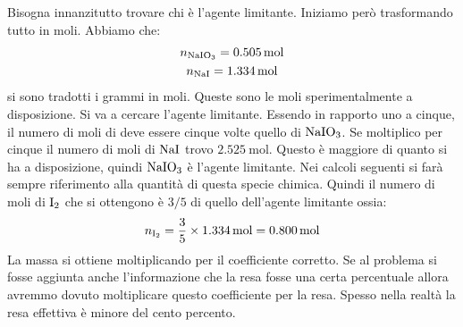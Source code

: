 \documentclass[../AppuntiChimica]{subfiles}
\begin{document}
	\begin{svol}
		Bisogna innanzitutto trovare chi è l'agente limitante. Iniziamo però trasformando tutto in moli. Abbiamo che:
		\begin{gather*}
			n_{\text{NaIO}_{3}}=\SI{0.505}{\mole}\\
			n_{\text{NaI}}=\SI{1.334}{\mole}
		\end{gather*}
		si sono tradotti i grammi in moli. Queste sono le moli sperimentalmente a disposizione. Si va a cercare l'agente limitante. Essendo in rapporto uno a cinque, il numero di moli di  deve essere cinque volte quello di $ \text{NaIO}_{3} $. Se moltiplico per cinque il numero di moli di $ \text{NaI} $ trovo $ \SI{2.525}{\mole} $. Questo è maggiore di quanto si ha a disposizione, quindi $ \text{NaIO}_{3} $ è l'agente limitante. Nei calcoli seguenti si farà sempre riferimento alla quantità di questa specie chimica. Quindi il numero di moli di $ \text{I}_{2} $ che si ottengono è $ 3/5 $ di quello dell'agente limitante ossia:
		\begin{gather*}
		n_{\text{I}_{2}}=\dfrac{3}{5}\times\SI{1.334}{\mole}=\SI{0.800}{\mole}
		\end{gather*}
		La massa si ottiene moltiplicando per il coefficiente corretto. Se al problema si fosse aggiunta anche l'informazione che la resa fosse una certa percentuale allora avremmo dovuto moltiplicare questo coefficiente per la resa. Spesso nella realtà la resa effettiva è minore del cento percento.
	\end{svol}
\end{document}
